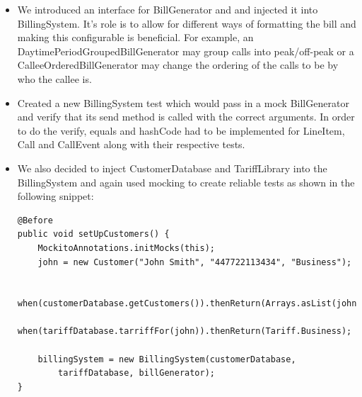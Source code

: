 \documentclass[a4paper,11pt]{article}
\begin{document}
\begin{itemize}
\item We introduced an interface for BillGenerator and and injected it into BillingSystem. It's role is to allow for different ways of formatting the bill and making this configurable is beneficial. For example, an DaytimePeriodGroupedBillGenerator may group calls into peak/off-peak or a CalleeOrderedBillGenerator may change the ordering of the calls to be by who the callee is.
\item Created a new BillingSystem test which would pass in a mock BillGenerator and verify that its send method is called with the correct arguments. In order to do the verify, equals and hashCode had to be implemented for LineItem, Call and CallEvent along with their respective tests.
\item We also decided to inject CustomerDatabase and TariffLibrary into the BillingSystem and again used mocking to create reliable tests as shown in the following snippet: 

\begin{lstlisting}[caption=Set up method in BillingSystemTest showing use of mock CustomerDatabase and TariffLibrary]
@Before
public void setUpCustomers() {
    MockitoAnnotations.initMocks(this);
    john = new Customer("John Smith", "447722113434", "Business");

    when(customerDatabase.getCustomers()).thenReturn(Arrays.asList(john));
    when(tariffDatabase.tarriffFor(john)).thenReturn(Tariff.Business);

    billingSystem = new BillingSystem(customerDatabase, 
    	tariffDatabase, billGenerator);
}
\end{lstlisting}


\end{itemize}
\end{document}
